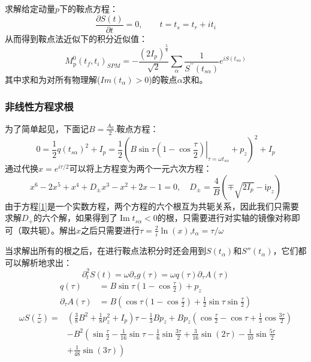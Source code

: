\documentclass[a4paper]{ctexart}
\begin{document}
求解给定动量$p$下的鞍点方程：
\begin{equation}
\frac{\partial S(t)}{\partial t}=0, \quad \quad t=t_{s}=t_{r}+i t_{i}
\end{equation}
从而得到鞍点法近似下的积分近似值：
\begin{equation}
M_{\mathrm{p}}^{0}\left(t_{f}, t_{i}\right)_{S P M}=-\frac{\left(2 I_{p}\right)^{\frac{5}{4}}}{\sqrt{2}} \sum_{\alpha} \frac{1}{S^{\prime \prime}\left(t_{s \alpha}\right)} e^{i S\left(t_{s \alpha}\right)}
\end{equation}
其中求和为对所有物理解($Im(t_{\alpha})>0$)的鞍点$\alpha$求和。

\subsubsection{非线性方程求根}
为了简单起见，下面记$B=\frac{A_0}{2}$.鞍点方程：
\begin{equation}
0=\frac{1}{2} q\left(t_{s \alpha}\right)^{2}+I_{p}=\frac{1}{2}\left(B \sin \tau\left.\left(1-\cos \frac{\tau}{2}\right)\right|_{\tau=\omega t_{s \alpha}}+p_{z}\right)^{2}+I_{p}\label{1}
\end{equation}
通过代换$x=e^{i\tau/2}$可以将上方程变为两个一元六次方程：
\begin{equation}
x^{6}-2 x^{5}+x^{4}+D_{ \pm} x^{3}-x^{2}+2 x-1=0, \quad D_{ \pm}=\frac{4}{B}\left(\mp \sqrt{2 I_{p}}-\mathrm{i} p_{z}\right)
\end{equation}
由于方程\ref{1}是一个实数方程，两个方程的六个根互为共轭关系，因此我们只需要求解$D_+$的六个解，如果得到了$\operatorname{Im} t_{s \alpha}<0$的根，只需要进行对实轴的镜像对称即可（取共轭）。解出$x$之后只需要进行$\tau=\frac{2}{i}\ln(x)$,$t_\alpha=\tau/\omega$

当求解出所有的根之后，在进行鞍点法积分时还会用到$S(t_\alpha)$和$S''(t_\alpha)$，它们都可以解析地求出：
\begin{equation}
\partial_{t}^{2} S(t)=\omega \partial_{\tau} g(\tau)=\omega q(\tau) \partial_{\tau} A(\tau)
\end{equation}
\begin{equation}
\begin{aligned} q(\tau) &=B \sin \tau\left(1-\cos \frac{\tau}{2}\right)+p_{z} \\ \partial_{\tau} A(\tau) &=B\left(\cos \tau\left(1-\cos \frac{\tau}{2}\right)+\frac{1}{2} \sin \tau \sin \frac{\tau}{2}\right) \end{aligned}
\end{equation}
\begin{equation}\begin{aligned} \omega S\left(\frac{\tau}{\omega}\right)=&\left(\frac{3}{8} B^{2}+\frac{1}{8} p_{z}^{2}+I_{p}\right) \tau-\frac{1}{3} B p_{z}+B p_{z}\left(\cos \frac{\tau}{2}-\cos \tau+\frac{1}{3} \cos \frac{3 \tau}{2}\right) \\ &-B^{2}\left(\sin \frac{\tau}{2}-\frac{1}{16} \sin \tau-\frac{1}{6} \sin \frac{3 \tau}{2}+\frac{3}{16} \sin (2 \tau)-\frac{1}{10} \sin \frac{5 \tau}{2}\right.\\ &\left. +\frac{1}{48} \sin (3 \tau) \right) \end{aligned}
\end{equation}
\end{document}
